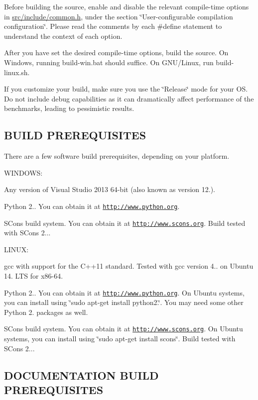 Before building the source, enable and disable the relevant compile-\/time options in \hyperlink{common_8h}{src/include/common.\-h}, under the section \char`\"{}\-User-\/configurable compilation configuration\char`\"{}. Please read the comments by each \#define statement to understand the context of each option.

After you have set the desired compile-\/time options, build the source. On Windows, running build-\/win.\-bat should suffice. On G\-N\-U/\-Linux, run build-\/linux.\-sh.

If you customize your build, make sure you use the \char`\"{}\-Release\char`\"{} mode for your O\-S. Do not include debug capabilities as it can dramatically affect performance of the benchmarks, leading to pessimistic results. 

 \subsection*{B\-U\-I\-L\-D P\-R\-E\-R\-E\-Q\-U\-I\-S\-I\-T\-E\-S }

There are a few software build prerequisites, depending on your platform.

W\-I\-N\-D\-O\-W\-S\-:


\begin{DoxyItemize}
\item Any version of Visual Studio 2013 64-\/bit (also known as version 12.).
\item Python 2.. You can obtain it at \href{http://www.python.org}{\tt http\-://www.\-python.\-org}.
\item S\-Cons build system. You can obtain it at \href{http://www.scons.org}{\tt http\-://www.\-scons.\-org}. Build tested with S\-Cons 2...
\end{DoxyItemize}

L\-I\-N\-U\-X\-:


\begin{DoxyItemize}
\item gcc with support for the C++11 standard. Tested with gcc version 4.. on Ubuntu 14. L\-T\-S for x86-\/64.
\item Python 2.. You can obtain it at \href{http://www.python.org}{\tt http\-://www.\-python.\-org}. On Ubuntu systems, you can install using \char`\"{}sudo apt-\/get install python2.\char`\"{}. You may need some other Python 2. packages as well.
\item S\-Cons build system. You can obtain it at \href{http://www.scons.org}{\tt http\-://www.\-scons.\-org}. On Ubuntu systems, you can install using \char`\"{}sudo apt-\/get install scons\char`\"{}. Build tested with S\-Cons 2... 

 \subsection*{D\-O\-C\-U\-M\-E\-N\-T\-A\-T\-I\-O\-N B\-U\-I\-L\-D P\-R\-E\-R\-E\-Q\-U\-I\-S\-I\-T\-E\-S }
\end{DoxyItemize}

